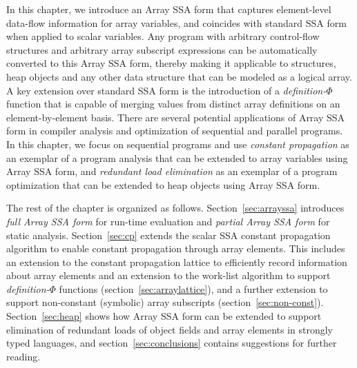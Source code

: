 In this chapter,
we introduce an Array SSA form 
that captures element-level data-flow information for array variables, and
coincides with standard SSA form when applied to scalar variables.  
Any program with arbitrary control-flow structures and arbitrary array
subscript expressions can be automatically converted to this 
Array SSA form, thereby making it applicable to structures, heap
objects and any other data structure
that can be modeled as a logical array.
A key extension over standard SSA form is the introduction of a
{\em definition-$\Phi$} function that is capable of
merging values from distinct array definitions on an element-by-element
basis. 
There are several potential applications of Array SSA form in compiler
analysis
and optimization of sequential and parallel programs.
In this chapter, we focus on sequential programs and use
{\em constant propagation}
as an exemplar of a program analysis that can be extended to array variables
using Array SSA form, and {\em redundant load elimination} as an
exemplar  of a program optimization that can be extended to heap objects using Array SSA form.

The rest of the chapter is organized as follows.
Section~\ref{sec:arrayssa} introduces {\em full Array SSA form} for run-time
evaluation and {\em partial Array SSA form}
for static analysis.  
Section~\ref{sec:cp} extends the scalar SSA
constant propagation algorithm to enable
constant propagation through array elements.
This includes an extension to the constant
propagation lattice to efficiently
record information about array
elements and an extension to the
work-list algorithm to support  {\em definition-$\Phi$} functions (section~\ref{sec:arraylattice}), and
a further extension to support non-constant (symbolic) array
subscripts (section~\ref{sec:non-const}). 
Section~\ref{sec:heap} shows how Array SSA form can be extended to
support elimination of redundant loads of 
object fields and array elements in strongly typed languages,
and section~\ref{sec:conclusions} contains suggestions for further reading.



